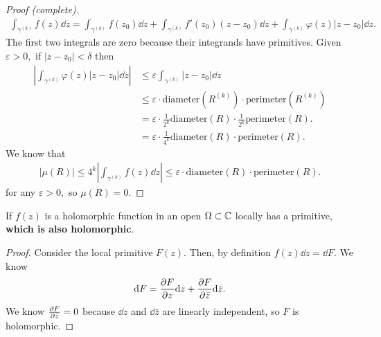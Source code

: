 \documentclass[a4paper,12pt]{article}
\begin{document}
\begin{theorem}[Cauchy]
\begin{proof}[Proof (complete)]
\begin{align}
            \int_{\gamma^{(k)}}f(z)\dd z=\int_{\gamma^{(k)}}f(z_0)\dd z+\int_{\gamma^{(k)}}f'(z_0)(z-z_0)\dd z+\int_{\gamma^{(k)}}\varphi(z)|z-z_0|\dd z.
        \end{align}
        The first two integrals are zero because their integrands have primitives. Given $\varepsilon>0,$ if $|z-z_0|<\delta$ then \begin{align}
            \left|\int_{\gamma^{(k)}}\varphi(z)|z-z_0|\dd z\right|&\leq\varepsilon\int_{\gamma^{(k)}}|z-z_0|\dd z\\
            &\leq\varepsilon\cdot\mathrm{diameter}(R^{(k)})\cdot\mathrm{perimeter}(R^{(k)})\\
            &=\varepsilon\cdot\frac{1}{2^k}\mathrm{diameter}(R)\cdot\frac{1}{2^k}\mathrm{perimeter}(R).\\
            &=\varepsilon\cdot\frac{1}{4^k}\mathrm{diameter}(R)\cdot\mathrm{perimeter}(R).
        \end{align}
        We know that \begin{align}
            |\mu(R)|\leq 4^k\left|\int_{\gamma^{(k)}}f(z)\dd z\right|\leq\varepsilon\cdot\mathrm{diameter}(R)\cdot\mathrm{perimeter}(R).
        \end{align}
        for any $\varepsilon>0,$ so $\mu(R)=0.$
    \end{proof}
\end{theorem}
\begin{corollary}
    If $f(z)$ is a holomorphic function in an open $\Omega\subset\mathbb{C}$ locally has a primitive, \textbf{which is also holomorphic}.
    \begin{proof}
        Consider the local primitive $F(z).$ Then, by definition $f(z)\dd z=\dd F.$ We know \begin{align}
            \dd F=\partialderivative{F}{z}\dd z+\partialderivative{F}{\bar z}\dd\bar z. 
        \end{align}
        We know $\partialderivative{F}{\bar z}=0$ because $\dd z$ and $\dd\bar z$ are linearly independent, so $F$ is holomorphic.
    \end{proof}
\end{corollary}
\end{document}

